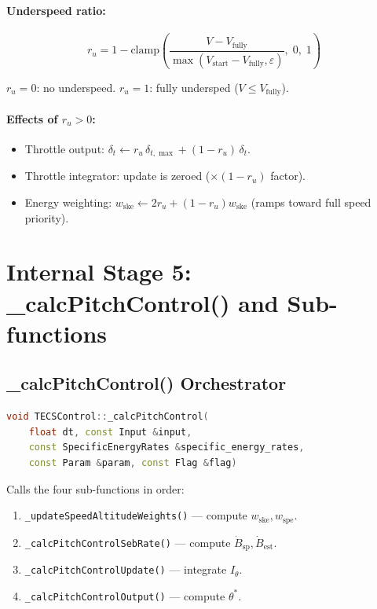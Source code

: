 \documentclass[12pt,a4paper]{article}
\begin{document}
\paragraph{Underspeed ratio:}
\begin{equation}
  r_u = 1 - \text{clamp}\!\left(\frac{V - V_{\text{fully}}}
    {\max(V_{\text{start}} - V_{\text{fully}}, \varepsilon)},\;0,\;1\right)
\end{equation}

$r_u = 0$: no underspeed. $r_u = 1$: fully undersped ($V \leq V_{\text{fully}}$).

\paragraph{Effects of $r_u > 0$:}
\begin{itemize}
  \item Throttle output: $\delta_t \leftarrow r_u\,\delta_{t,\max} + (1-r_u)\,\delta_t$.
  \item Throttle integrator: update is zeroed ($\times (1-r_u)$ factor).
  \item Energy weighting: $w_{\text{ske}} \leftarrow 2r_u + (1-r_u)w_{\text{ske}}$
        (ramps toward full speed priority).
\end{itemize}

\section{Internal Stage 5: \_calcPitchControl() and Sub-functions}

\subsection{\_calcPitchControl() Orchestrator}

\begin{lstlisting}[language=C++]
void TECSControl::_calcPitchControl(
    float dt, const Input &input,
    const SpecificEnergyRates &specific_energy_rates,
    const Param &param, const Flag &flag)
\end{lstlisting}

Calls the four sub-functions in order:
\begin{enumerate}
  \item \texttt{\_updateSpeedAltitudeWeights()} --- compute $w_{\text{ske}}, w_{\text{spe}}$.
  \item \texttt{\_calcPitchControlSebRate()} --- compute $\dot{B}_{\text{sp}}, \dot{B}_{\text{est}}$.
  \item \texttt{\_calcPitchControlUpdate()} --- integrate $I_\theta$.
  \item \texttt{\_calcPitchControlOutput()} --- compute $\theta^*$.
\end{enumerate}
\end{document}
